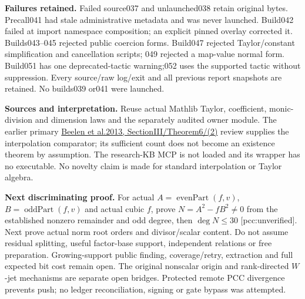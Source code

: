 \documentclass[10pt]{article}
\begin{document}
\textbf{Failures retained.}
Failed source037 and unlaunched038 retain original bytes.
Precall041 had stale administrative metadata and was never launched.
Build042 failed at import namespace composition; an explicit pinned
overlay corrected it. Builds043--045 rejected public coercion forms.
Build047 rejected Taylor/constant simplification and cancellation scripts;
049 rejected a map-value normal form. Build051 has one deprecated-tactic
warning;052 uses the supported tactic without suppression.
Every source/raw log/exit and all previous report snapshots are retained.
No builds039 or041 were launched.

\textbf{Sources and interpretation.}
Reuse actual Mathlib Taylor, coefficient, monic-division and dimension
laws and the separately audited owner module. The earlier primary
\href{https://doi.org/10.1109/TIT.2013.2243800}{Beelen et al.2013,
SectionIII/Theorem6/(2)} review supplies the interpolation comparator;
its sufficient count does not become an existence theorem by assumption.
The research-KB MCP is not loaded and its wrapper has no executable.
No novelty claim is made for standard interpolation or Taylor algebra.

\textbf{Next discriminating proof.}
For actual $A=\operatorname{evenPart}(f,v)$,
$B=\operatorname{oddPart}(f,v)$ and actual cubic $f$, prove
$N=A^2-fB^2\ne0$ from the established nonzero remainder and odd degree,
then $\deg N\le30$ [pcc:unverified]. Next prove actual norm root orders and divisor/scalar
content. Do not assume residual splitting, useful factor-base support,
independent relations or free preparation. Growing-support public finding,
coverage/retry, extraction and full expected bit cost remain open.
The original nonscalar origin and rank-directed $W$-jet mechanisms are
separate open bridges. Protected remote PCC divergence prevents push;
no ledger reconciliation, signing or gate bypass was attempted.
\end{document}
